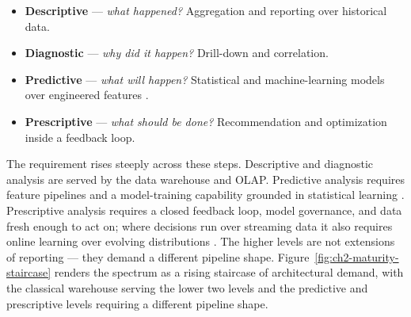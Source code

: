 \begin{itemize}[noitemsep, topsep=4pt]
  \item \textbf{Descriptive} --- \textit{what happened?} Aggregation and reporting over historical data.
  \item \textbf{Diagnostic} --- \textit{why did it happen?} Drill-down and correlation.
  \item \textbf{Predictive} --- \textit{what will happen?} Statistical and machine-learning models over engineered features \parencite{jordan2015}.
  \item \textbf{Prescriptive} --- \textit{what should be done?} Recommendation and optimization inside a feedback loop.
\end{itemize}

\noindent The requirement rises steeply across these steps. Descriptive and diagnostic analysis are served by the data warehouse and OLAP. Predictive analysis requires feature pipelines and a model-training capability grounded in statistical learning \parencite{jordan2015}. Prescriptive analysis requires a closed feedback loop, model governance, and data fresh enough to act on; where decisions run over streaming data it also requires online learning over evolving distributions \parencite{bifet2018}. The higher levels are not extensions of reporting --- they demand a different pipeline shape. Figure~\ref{fig:ch2-maturity-staircase} renders the spectrum as a rising staircase of architectural demand, with the classical warehouse serving the lower two levels and the predictive and prescriptive levels requiring a different pipeline shape.

